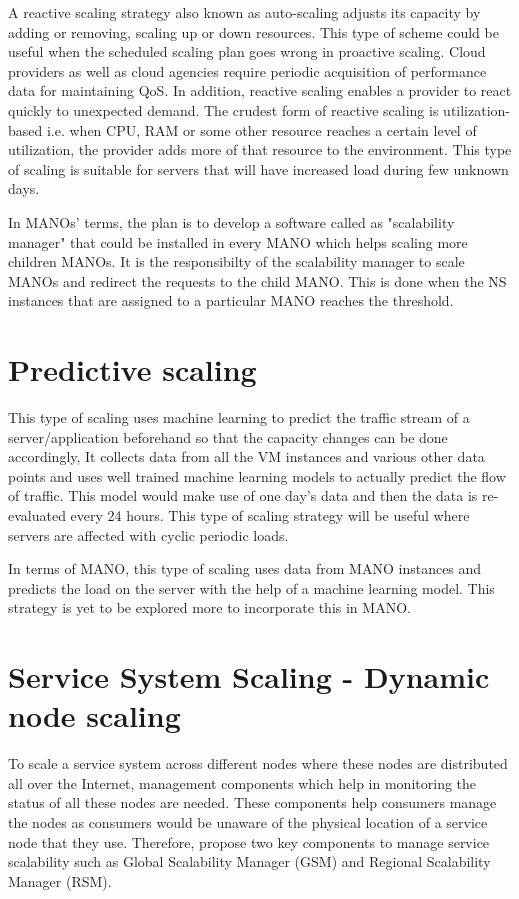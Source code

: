 A reactive scaling strategy also known as auto-scaling adjusts its capacity by adding or removing, scaling up or down resources.
This type of scheme could be useful when the scheduled scaling plan goes wrong in proactive scaling. Cloud providers as well as cloud agencies require periodic acquisition of performance data for maintaining QoS. In addition, reactive scaling enables a provider to react quickly to unexpected demand. The crudest form of reactive scaling is utilization-based i.e. when  CPU, RAM  or some other resource reaches a certain level of  utilization, the provider adds  more of that resource to the environment\cite{falatah_cloud_2014}\cite{reese_cloud_nodate}. This type of scaling is suitable for servers that will have increased load during few unknown days.

In MANOs' terms, the plan is to develop a software called as "scalability manager" that could be installed in every MANO which helps scaling more children MANOs. It is the responsibilty of the scalability manager to scale MANOs and redirect the requests to the child MANO. This is done when the NS instances that are assigned to a particular MANO reaches the threshold.


\section{Predictive scaling}
This type of scaling uses machine learning to predict the traffic stream of a server/application beforehand so that the capacity changes can be done accordingly, It collects data from all the VM instances and various other data points and uses well trained machine learning models to actually predict the flow of traffic. This model would make use of one day's data and then the data is re-evaluated every 24 hours. This type of scaling strategy will be useful where servers are affected with cyclic periodic loads.

In terms of MANO, this type of scaling uses data from MANO instances and predicts the load on the server with the help of a machine learning model. This strategy is yet to be explored more to incorporate this in MANO.


\section{Service System Scaling - Dynamic node scaling}

To scale a service system across different nodes where these nodes are distributed all over the Internet, management components which help in monitoring the status of all these nodes are needed. These components help consumers manage the nodes as consumers would be unaware of the physical location of a service node that they use. Therefore, \cite{lee_software_2010} propose two key components to manage service scalability such as Global Scalability Manager (GSM) and Regional Scalability Manager (RSM).

